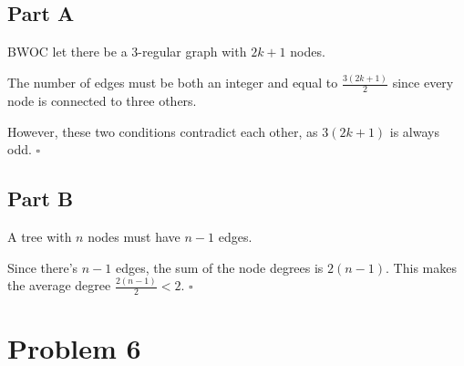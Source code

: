 \documentclass[12pt]{article}
\begin{document}
\subsection{Part A}

BWOC let there be a 3-regular graph with $2k+1$ nodes.

The number of edges must be both an integer and equal to $\frac{3(2k+1)}{2}$
since every node is connected to three others.

However, these two conditions contradict each other, as $3(2k+1)$ is always odd. $\square$

\subsection{Part B}

A tree with $n$ nodes must have $n-1$ edges.

Since there's $n-1$ edges, the sum of the node degrees is $2(n-1)$.
This makes the average degree $\frac{2(n-1)}{2} < 2$. $\square$

\section{Problem 6}
\end{document}
